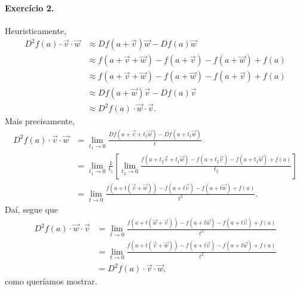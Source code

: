 \documentclass[12pt,a4paper]{article}
\begin{document}
\paragraph{Exercício 2.}
%
Heuristicamente,
%
\begin{align*}
    D^2f(a) \cdot \vec{v} \cdot \vec{w}
    &\approx 
    Df(a+\vec{v})\vec{w} - Df(a)\vec{w} \\
    &\approx
    f(a + \vec{v} + \vec{w}) - f(a + \vec{v}) - f(a + \vec{w}) + f(a) \\
    &\approx 
    f(a + \vec{v} + \vec{w}) - f(a + \vec{w}) - f(a + \vec{v}) + f(a) \\
    &\approx
    Df(a + \vec{w})\vec{v} - Df(a)\vec{v} \\
    &\approx
    D^2f(a) \cdot \vec{w} \cdot \vec{v}.
\end{align*}
%
Mais precisamente,
%
\begin{align*}
    D^2f(a) \cdot \vec{v} \cdot \vec{w}
    &=
    \lim_{t_1 \to 0} \frac{Df(a + \vec{v} + t_1\vec{w}) - Df(a + t_1\vec{w})}{t} \\
    &=
    \lim_{t_1 \to 0} \frac{1}{t_1}
    \left[ 
    \lim_{t_2 \to 0} \frac{f(a + t_2\vec{v} + t_1\vec{w}) - f(a + t_2\vec{v}) 
    - f(a + t_1\vec{w}) + f(a)}{t_2}
    \right] \\
    &=
    \lim_{t \to 0} 
    \frac{f(a + t(\vec{v} + \vec{w})) - f(a + t\vec{v}) - f(a + t\vec{w}) + f(a)}{t^2}.
\end{align*}
%
Daí, segue que
%
\begin{align*}
    D^2f(a) \cdot \vec{w} \cdot \vec{v}
    &=
    \lim_{t \to 0} 
    \frac{f(a + t(\vec{w} + \vec{v})) - f(a + t\vec{w}) - f(a + t\vec{v}) + f(a)}{t^2} \\
    &=
    \lim_{t \to 0} 
    \frac{f(a + t(\vec{v} + \vec{w})) - f(a + t\vec{v}) - f(a + t\vec{w}) + f(a)}{t^2} \\
    &=
    D^2f(a) \cdot \vec{v} \cdot \vec{w},
\end{align*}
%
como queríamos mostrar.
\end{document}

